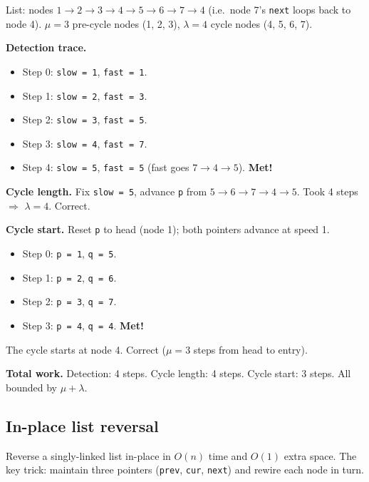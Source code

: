 \documentclass[11pt]{article}
\begin{document}
\begin{examplebox}
List: nodes $1 \to 2 \to 3 \to 4 \to 5 \to 6 \to 7 \to 4$ (i.e.\
node 7's \texttt{next} loops back to node 4). $\mu = 3$ pre-cycle
nodes (1, 2, 3), $\lambda = 4$ cycle nodes (4, 5, 6, 7).

\textbf{Detection trace.}
\begin{itemize}[leftmargin=*]
    \item Step 0: \texttt{slow = 1}, \texttt{fast = 1}.
    \item Step 1: \texttt{slow = 2}, \texttt{fast = 3}.
    \item Step 2: \texttt{slow = 3}, \texttt{fast = 5}.
    \item Step 3: \texttt{slow = 4}, \texttt{fast = 7}.
    \item Step 4: \texttt{slow = 5}, \texttt{fast = 5} (fast goes
          $7 \to 4 \to 5$). \textbf{Met!}
\end{itemize}

\textbf{Cycle length.} Fix \texttt{slow = 5}, advance \texttt{p}
from $5 \to 6 \to 7 \to 4 \to 5$. Took 4 steps $\Rightarrow$
$\lambda = 4$. Correct.

\textbf{Cycle start.} Reset \texttt{p} to head (node 1); both
pointers advance at speed 1.
\begin{itemize}[leftmargin=*]
    \item Step 0: \texttt{p = 1}, \texttt{q = 5}.
    \item Step 1: \texttt{p = 2}, \texttt{q = 6}.
    \item Step 2: \texttt{p = 3}, \texttt{q = 7}.
    \item Step 3: \texttt{p = 4}, \texttt{q = 4}. \textbf{Met!}
\end{itemize}
The cycle starts at node 4. Correct ($\mu = 3$ steps from head
to entry).

\textbf{Total work.} Detection: 4 steps. Cycle length: 4 steps.
Cycle start: 3 steps. All bounded by $\mu + \lambda$.
\end{examplebox}

\subsection*{In-place list reversal}

Reverse a singly-linked list in-place in $O(n)$ time and $O(1)$
extra space. The key trick: maintain three pointers
(\texttt{prev}, \texttt{cur}, \texttt{next}) and rewire each node
in turn.
\end{document}
